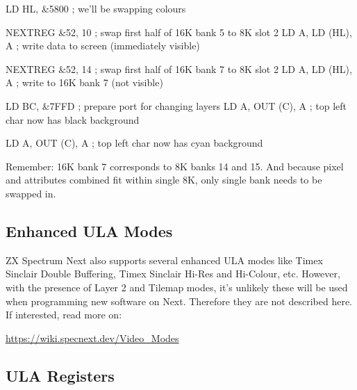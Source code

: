 \begin{tcblisting}{}
    LD HL, &5800        ; we'll be swapping colours

    NEXTREG &52, 10     ; swap first half of 16K bank 5 to 8K slot 2
    LD A, %
    LD (HL), A          ; write data to screen (immediately visible)
    
    NEXTREG &52, 14     ; swap first half of 16K bank 7 to 8K slot 2
    LD A, %
    LD (HL), A          ; write to 16K bank 7 (not visible)
    
    LD BC, &7FFD        ; prepare port for changing layers
    LD A, %
    OUT (C), A          ; top left char now has black background

    LD A, %
    OUT (C), A          ; top left char now has cyan background
\end{tcblisting}

Remember: 16K bank 7 corresponds to 8K banks 14 and 15. And because pixel and attributes combined fit within single 8K, only single bank needs to be swapped in.

\subsection{Enhanced ULA Modes}

ZX Spectrum Next also supports several enhanced ULA modes like Timex Sinclair Double Buffering, Timex Sinclair Hi-Res and Hi-Colour, etc. However, with the presence of Layer 2 and Tilemap modes, it's unlikely these will be used when programming new software on Next. Therefore they are not described here. If interested, read more on:

\url{https://wiki.specnext.dev/Video_Modes}


\subsection{ULA Registers}
\label{zx_next_ula_registers}

\subsubsection{}

\begin{NextPort}
\end{NextPort}

